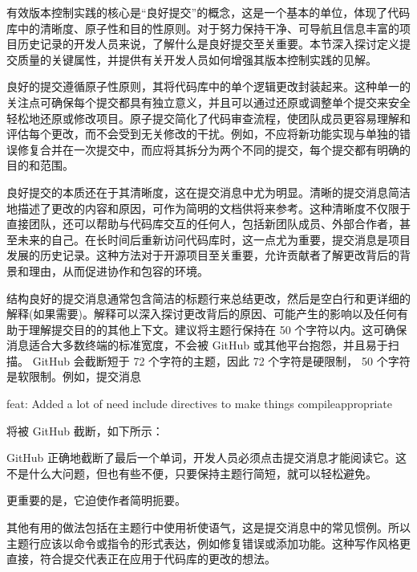 
有效版本控制实践的核心是“良好提交”的概念，这是一个基本的单位，体现了代码库中的清晰度、原子性和目的性原则。对于努力保持干净、可导航且信息丰富的项目历史记录的开发人员来说，了解什么是良好提交至关重要。本节深入探讨定义提交质量的关键属性，并提供有关开发人员如何增强其版本控制实践的见解。


良好的提交遵循原子性原则，其将代码库中的单个逻辑更改封装起来。这种单一的关注点可确保每个提交都具有独立意义，并且可以通过还原或调整单个提交来安全轻松地还原或修改项目。原子提交简化了代码审查流程，使团队成员更容易理解和评估每个更改，而不会受到无关修改的干扰。例如，不应将新功能实现与单独的错误修复合并在一次提交中，而应将其拆分为两个不同的提交，每个提交都有明确的目的和范围。


良好提交的本质还在于其清晰度，这在提交消息中尤为明显。清晰的提交消息简洁地描述了更改的内容和原因，可作为简明的文档供将来参考。这种清晰度不仅限于直接团队，还可以帮助与代码库交互的任何人，包括新团队成员、外部合作者，甚至未来的自己。在长时间后重新访问代码库时，这一点尤为重要，提交消息是项目发展的历史记录。这种方法对于开源项目至关重要，允许贡献者了解更改背后的背景和理由，从而促进协作和包容的环境。

结构良好的提交消息通常包含简洁的标题行来总结更改，然后是空白行和更详细的解释(如果需要)。解释可以深入探讨更改背后的原因、可能产生的影响以及任何有助于理解提交目的的其他上下文。建议将主题行保持在 50 个字符以内。这可确保消息适合大多数终端的标准宽度，不会被 GitHub 或其他平台抱怨，并且易于扫描。 GitHub 会截断短于 72 个字符的主题，因此 72 个字符是硬限制， 50 个字符是软限制。例如，提交消息

\begin{shell}
feat: Added a lot of need include directives to make things compileappropriate
\end{shell}

将被 GitHub 截断，如下所示：


GitHub 正确地截断了最后一个单词，开发人员必须点击提交消息才能阅读它。这不是什么大问题，但也有些不便，只要保持主题行简短，就可以轻松避免。

更重要的是，它迫使作者简明扼要。

其他有用的做法包括在主题行中使用祈使语气，这是提交消息中的常见惯例。所以主题行应该以命令或指令的形式表达，例如修复错误或添加功能。这种写作风格更直接，符合提交代表正在应用于代码库的更改的想法。

